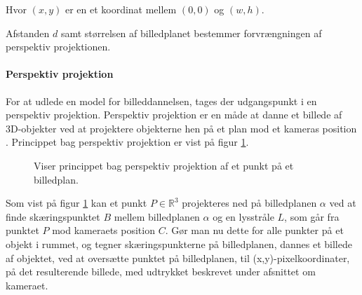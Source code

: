 Hvor $(x,y)$ er en et koordinat mellem $(0,0)$ og $(w,h)$.

Afstanden $d$ samt størrelsen af billedplanet bestemmer forvrængningen af perspektiv projektionen.

\paragraph{Perspektiv projektion}
\label{sec:perspektiv_projektion}
For at udlede en model for billeddannelsen, tages der udgangspunkt i en perspektiv projektion. Perspektiv projektion er en måde at danne et billede af 3D-objekter ved at projektere objekterne hen på et plan mod et kameras position \cite{perspective_projection}. Princippet bag perspektiv projektion er vist på figur \ref{fig:perspektiv_projektion}.

\begin{figure}[H]
  \centering
  \caption{Viser princippet bag perspektiv projektion af et punkt på et billedplan.}
  \label{fig:perspektiv_projektion}
\end{figure}

Som vist på figur \ref{fig:perspektiv_projektion} kan et punkt $P\in \mathbb{R}^3$ projekteres ned på billedplanen $\alpha$ ved at finde skæringspunktet $B$ mellem billedplanen $\alpha$ og en lysstråle $L$, som går fra punktet $P$ mod kameraets position $C$. Gør man nu dette for alle punkter på et objekt i rummet, og tegner skæringspunkterne på billedplanen, dannes et billede af objektet, ved at oversætte punktet på billedplanen, til (x,y)-pixelkoordinater, på det resulterende billede, med udtrykket beskrevet under afsnittet om kameraet.


